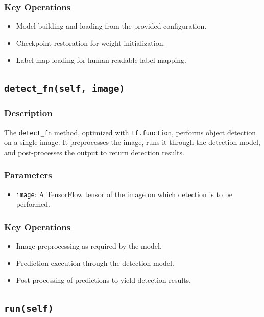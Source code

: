\subsubsection{Key Operations}
\begin{itemize}
	\item Model building and loading from the provided configuration.
	\item Checkpoint restoration for weight initialization.
	\item Label map loading for human-readable label mapping.
\end{itemize}

\subsection{\texttt{detect\_fn(self, image)}}

\subsubsection{Description}
The \texttt{detect\_fn} method, optimized with \texttt{tf.function}, performs object detection on a single image. It preprocesses the image, runs it through the detection model, and post-processes the output to return detection results.

\subsubsection{Parameters}
\begin{itemize}
	\item \texttt{image}: A TensorFlow tensor of the image on which detection is to be performed.
\end{itemize}

\subsubsection{Key Operations}
\begin{itemize}
	\item Image preprocessing as required by the model.
	\item Prediction execution through the detection model.
	\item Post-processing of predictions to yield detection results.
\end{itemize}

\subsection{\texttt{run(self)}}

